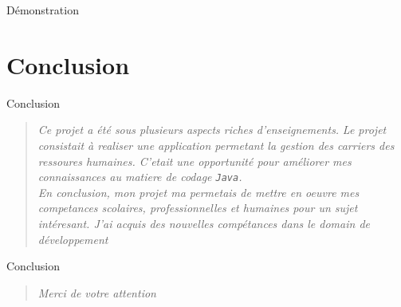 \documentclass[captions=tableheading]{beamer}
\begin{document}
\begin{frame}[label={sec:org4374f8d}]{Démonstration}
\end{frame}

\section{Conclusion}
\label{sec:orga329362}
\begin{frame}[fragile,label={sec:org6c024d4}]{Conclusion}
 \begin{quote}
\emph{Ce projet a été sous plusieurs aspects riches d'enseignements.}
\emph{Le projet consistait à realiser une application permetant la gestion des carriers des ressoures humaines. C'etait une opportunité pour améliorer mes connaissances au matiere de codage \texttt{Java}.}\\

\emph{En conclusion, mon projet ma permetais de mettre en oeuvre mes competances scolaires, professionnelles et humaines pour un sujet intéresant. J'ai acquis des nouvelles compétances dans le domain de développement}
\end{quote}
\end{frame}

\begin{frame}[label={sec:org74a9c6a}]{Conclusion}
\begin{quote}
\emph{Merci de votre attention}
\end{quote}
\end{frame}
\end{document}
